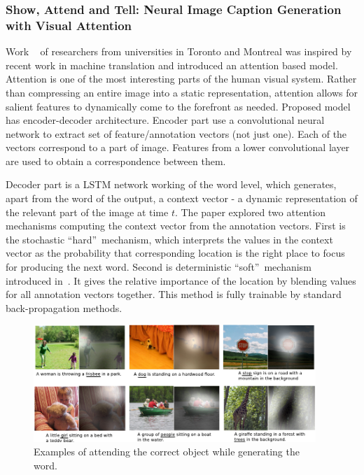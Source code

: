 		\subsubsection{Show, Attend and Tell: Neural Image Caption Generation with Visual Attention}

Work ~\cite{DBLP:journals/corr/XuBKCCSZB15} of researchers from universities in Toronto and Montreal was inspired by recent work in machine translation and introduced an attention based model. Attention is one of the most interesting parts of the human visual system. Rather than compressing an entire image into a static representation, attention allows for salient features to dynamically come to the forefront as needed. Proposed model has encoder-decoder architecture. Encoder part use a convolutional neural network to extract set of feature/annotation vectors (not just one). Each of the vectors correspond to a part of image. Features from a lower convolutional layer are used to obtain a correspondence between them.

Decoder part is a LSTM network working of the word level, which generates, apart from the word of the output, a context vector - a dynamic representation of the relevant part of the image at time $ t $. The paper explored two attention mechanisms computing the context vector from the annotation vectors. First is the stochastic \textquotedblleft hard\textquotedblright\ mechanism, which interprets the values in the context vector as the probability that corresponding location is the right place to focus for producing the next word. Second is deterministic \textquotedblleft soft\textquotedblright\ mechanism introduced in~\cite{DBLP:journals/corr/BahdanauCB14}. It gives the relative importance of the location by blending values for all annotation vectors together. This method is fully trainable by standard back-propagation methods.

\begin{figure}[!t]
	\centering
	\includegraphics[width=0.95\textwidth]{./fig/show-attend-tell_example-correct.pdf}
	\caption{Examples of attending the correct object while generating the word.~\cite{DBLP:journals/corr/XuBKCCSZB15}
		\label{fig:attendmodelcorrect}}
\end{figure}

